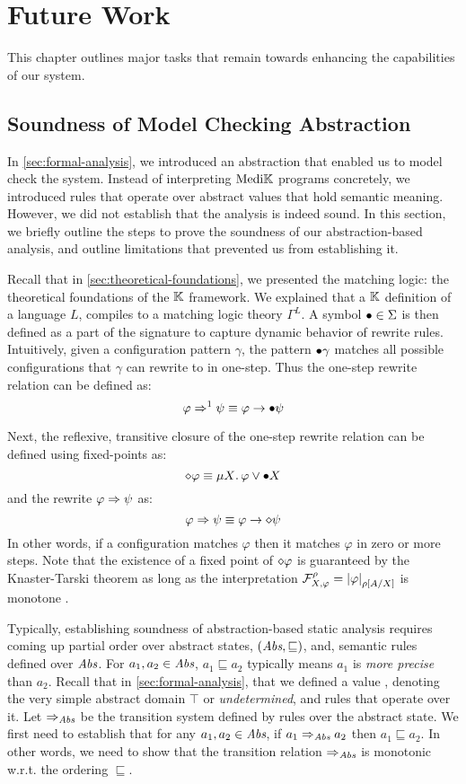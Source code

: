 \chapter{Future Work}

This chapter outlines major tasks that remain towards enhancing the capabilities
of our system.

\section{Soundness of Model Checking Abstraction}\label{sec:abstraction-soundness}

In \autoref{sec:formal-analysis}, we introduced an abstraction that enabled us
to model check the system. Instead of interpreting $\text{Medi}\mathbb{K}{}{}$ programs
concretely, we introduced rules that operate over abstract values
that hold semantic meaning. However, we did not establish that the analysis is
indeed sound. In this section, we briefly outline the steps to prove the
soundness of our abstraction-based analysis, and outline limitations that
prevented us from establishing it.

Recall that in \autoref{sec:theoretical-foundations}, we presented the
matching logic: the theoretical foundations of the $\mathbb{K}$ framework. We explained
that a $\mathbb{K}$ definition of a language $L$, compiles to a matching logic theory
$\Gamma^L$. A symbol ${\bullet} \in \Sigma$ is then defined as a part of the
signature to capture dynamic behavior of rewrite rules.
Intuitively, given a configuration
pattern $\gamma$, the pattern ${\bullet} \gamma$ matches all possible
configurations that $\gamma$ can rewrite to in one-step. Thus
the one-step rewrite relation can be defined as:
$$
  \varphi \Rightarrow^1 \psi \equiv \varphi \to {\bullet} \psi
$$

Next, the reflexive, transitive closure of the one-step rewrite relation
can be defined using fixed-points as:
$$
  \diamond \varphi \equiv \mu X \mathord{.\,} \varphi \vee {\bullet} X
$$
and the rewrite $\varphi \Rightarrow \psi$ as:
$$
  \varphi \Rightarrow \psi \equiv \varphi \to \diamond \psi
$$
In other words, if a configuration matches
$\varphi$ then it matches $\varphi$ in zero or more steps.
Note that the existence of a fixed point of $\diamond\varphi$
is guaranteed by the Knaster-Tarski theorem as long as the interpretation
$\mathcal{F}^{\rho}_{X,\varphi} = \left|\varphi\right|_{\rho\left[A / X\right]}$
is monotone \cite{ChenLICS19}.

Typically, establishing soundness of abstraction-based static analysis
requires coming up partial order over abstract states,
$\left(\textit{Abs}, \sqsubseteq\right)$, and, semantic rules defined over $\textit{Abs}$.
For $a_1, a_2 \in \textit{Abs}$, $a_1 \sqsubseteq a_2$ typically means $a_1$ is
\emph{more precise} than $a_2$. Recall that in \autoref{sec:formal-analysis},
that we defined a value , denoting the very simple abstract
domain $\top$ or \emph{undetermined},
and rules that operate over it. Let $\Rightarrow_{\textit{Abs}}$ be the transition
system defined by rules over the abstract state. We first need to
establish that for any $a_1, a_2 \in \textit{Abs}$, if $a_1 \Rightarrow_{\textit{Abs}} a_2$ then $a_1
\sqsubseteq a_2$. In other words, we need to show that the transition relation
$\Rightarrow_{\textit{Abs}}$ is monotonic w.r.t. the ordering $\sqsubseteq$.

